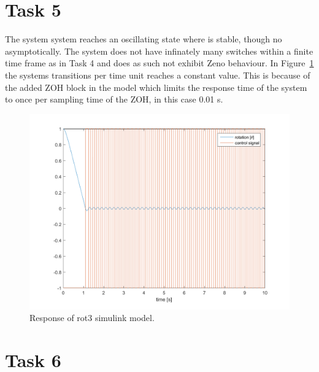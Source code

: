 \documentclass[a4paper,12pt,oneside,onecolumn]{article} %
\begin{document}
\section*{Task 5}
The system system reaches an oscillating state where is stable, though no
asymptotically. The system does not have infinately many switches within a
finite time frame as in Task 4 and does as such  not exhibit Zeno behaviour. In
Figure~\ref{fig:task5_plot} the systems transitions per time unit reaches a
constant value. This is because of the added ZOH block in the model which limits
the response time of the system to once per sampling time of the ZOH, in this
case 0.01 s. 
\begin{figure}[H]
    \centering
    \includegraphics[scale = 0.5, width=1\linewidth]{../matlab/images/task5_plot.png}
    \caption{Response of rot3 simulink model.}
    \label{fig:task5_plot}
\end{figure}

\section*{Task 6}
\end{document}
